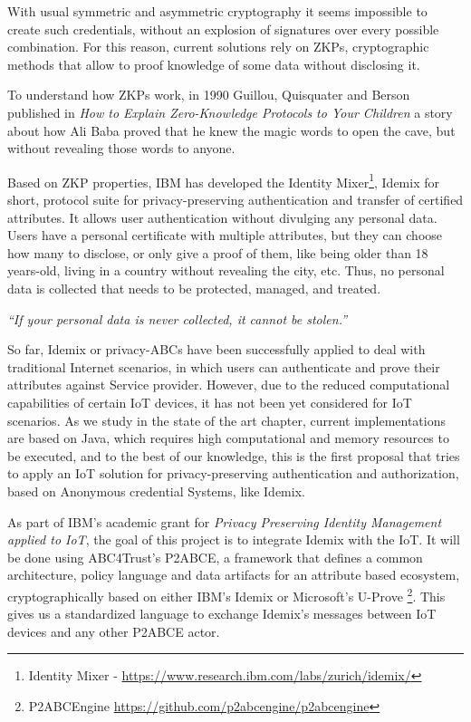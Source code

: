 \documentclass[journal]{IEEEtran}
\begin{document}
With usual symmetric and asymmetric cryptography it seems impossible to create such credentials, without an explosion of signatures over every possible combination. For this reason, current solutions rely on  ZKPs, cryptographic methods that allow to proof knowledge of some data without disclosing it.

To understand how ZKPs work, in 1990 Guillou, Quisquater and Berson published in \textit{How to Explain Zero-Knowledge Protocols to Your Children} \cite{ZKPcave:story} a story about how Ali Baba proved that he knew the magic words to open the cave, but without revealing those words to anyone.

Based on ZKP properties, IBM has developed the Identity Mixer\footnote{Identity Mixer - \url{https://www.research.ibm.com/labs/zurich/idemix/}}, Idemix for short, protocol suite for privacy-preserving authentication and transfer of certified attributes. It allows user authentication without divulging any personal data. Users have a personal certificate with multiple attributes, but they can choose how many to disclose, or only give a proof of them, like being older than 18 years-old, living in a country without revealing the city, etc. Thus, no personal data is collected that needs to be protected, managed, and treated.

\begin{center}
	\textit{``If your personal data is never collected, it cannot be stolen.''}
\end{center}

So far, Idemix or privacy-ABCs have been successfully applied to deal with traditional Internet scenarios, in which users can authenticate and prove their attributes against Service provider. However, due to the reduced computational capabilities of certain IoT devices, it has not been yet considered for IoT scenarios. As we study in the state of the art chapter, current implementations are based on Java, which requires high computational and memory resources to be executed, and to the best of our knowledge, this is the first proposal that tries to apply an IoT solution for privacy-preserving authentication and authorization, based on Anonymous credential Systems, like Idemix.


As part of IBM's academic grant for \textit{Privacy Preserving Identity Management applied to IoT}, the goal of this project is to integrate Idemix with the IoT. It will be done using ABC4Trust's P2ABCE, a framework that defines a common architecture, policy language and data artifacts for an attribute based ecosystem, cryptographically based on either IBM's Idemix or Microsoft's U-Prove \footnote{P2ABCEngine \url{https://github.com/p2abcengine/p2abcengine}}. This gives us a standardized language to exchange Idemix's messages between IoT devices and any other P2ABCE actor.
\end{document}
